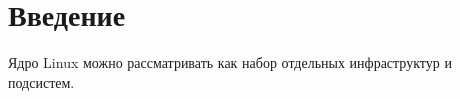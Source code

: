 
\section*{Введение}








Ядро Linux можно рассматривать как набор отдельных инфраструктур и подсистем.

